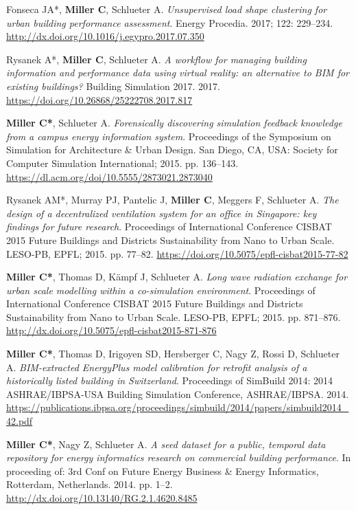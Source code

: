 \documentclass[10pt,a4paper]{article}
\begin{document}
\begin{small}
\begin{etaremune}
\item
Fonseca JA*, \textbf{Miller C}, Schlueter A. \emph{Unsupervised load shape clustering for urban building performance assessment}. Energy Procedia. 2017; 122: 229–234. \url{http://dx.doi.org/10.1016/j.egypro.2017.07.350}%
\item
Rysanek A*, \textbf{Miller C}, Schlueter A. \emph{A workflow for managing building information and performance data using virtual reality: an alternative to BIM for existing buildings?} Building Simulation 2017. 2017. \url{https://doi.org/10.26868/25222708.2017.817}
\item
\textbf{Miller C*}, Schlueter A. \emph{Forensically discovering simulation feedback knowledge from a campus energy information system}. Proceedings of the Symposium on Simulation for Architecture \& Urban Design. San Diego, CA, USA: Society for Computer Simulation International; 2015. pp. 136–143. \url{https://dl.acm.org/doi/10.5555/2873021.2873040}
\item
Rysanek AM*, Murray PJ, Pantelic J, \textbf{Miller C}, Meggers F, Schlueter A. \emph{The design of a decentralized ventilation system for an office in Singapore: key findings for future research}. Proceedings of International Conference CISBAT 2015 Future Buildings and Districts Sustainability from Nano to Urban Scale. LESO-PB, EPFL; 2015. pp. 77–82. \url{https://doi.org/10.5075/epfl-cisbat2015-77-82}
\item
\textbf{Miller C*}, Thomas D, Kämpf J, Schlueter A. \emph{Long wave radiation exchange for urban scale modelling within a co-simulation environment}. Proceedings of International Conference CISBAT 2015 Future Buildings and Districts Sustainability from Nano to Urban Scale. LESO-PB, EPFL; 2015. pp. 871–876. \url{http://dx.doi.org/10.5075/epfl-cisbat2015-871-876}
\item
\textbf{Miller C*}, Thomas D, Irigoyen SD, Hersberger C, Nagy Z, Rossi D, Schlueter A. \emph{BIM-extracted EnergyPlus model calibration for retrofit analysis of a historically listed building in Switzerland}. Proceedings of SimBuild 2014: 2014 ASHRAE/IBPSA-USA Building Simulation Conference, ASHRAE/IBPSA. 2014. \url{https://publications.ibpsa.org/proceedings/simbuild/2014/papers/simbuild2014_42.pdf}
\item
\textbf{Miller C*}, Nagy Z, Schlueter A. \emph{A seed dataset for a public, temporal data repository for energy informatics research on commercial building performance}. In proceeding of: 3rd Conf on Future Energy Business \& Energy Informatics, Rotterdam, Netherlands. 2014. pp. 1–2. \url{http://dx.doi.org/10.13140/RG.2.1.4620.8485}

\end{etaremune}
\end{small}
\end{document}
